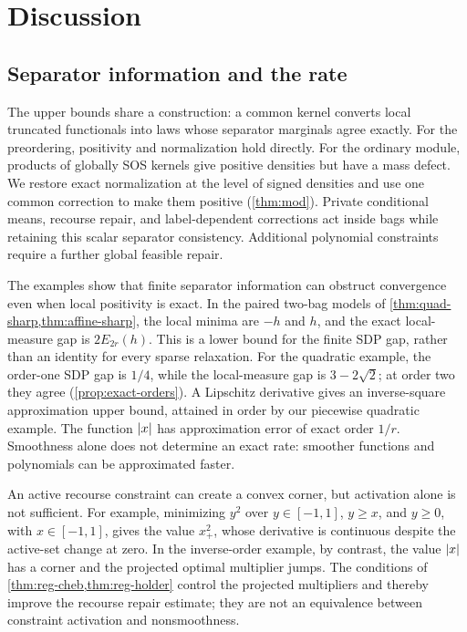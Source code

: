 \section{Discussion}\label{sec:discussion}

\subsection{Separator information and the rate}

The upper bounds share a construction: a common kernel converts local
truncated functionals into laws whose separator marginals agree exactly.
For the preordering, positivity and normalization hold directly. For the
ordinary module, products of globally SOS kernels give positive densities
but have a mass defect. We restore exact normalization at the level of
signed densities and use one common correction to make them positive
(\cref{thm:mod}). Private conditional means, recourse repair, and
label-dependent corrections act inside bags while retaining this scalar
separator consistency. Additional polynomial constraints require a further
global feasible repair.

The examples show that finite separator information can obstruct convergence
even when local positivity is exact. In the paired two-bag models of
\cref{thm:quad-sharp,thm:affine-sharp}, the local minima are $-h$ and $h$,
and the exact local-measure gap is $2E_{2r}(h)$. This is a lower bound for
the finite SDP gap, rather than an identity for every sparse relaxation.
For the quadratic example, the order-one SDP gap is $1/4$, while the
local-measure gap is $3-2\sqrt2$; at order two they agree
(\cref{prop:exact-orders}). A Lipschitz derivative gives an inverse-square
approximation upper bound, attained in order by our piecewise quadratic
example. The function $\lvert x\rvert$ has approximation error of exact order
$1/r$. Smoothness alone does not determine an exact rate: smoother functions
and polynomials can be approximated faster.

An active recourse constraint can create a convex corner, but activation
alone is not sufficient. For example, minimizing $y^2$ over
$y\in[-1,1]$, $y\ge x$, and $y\ge0$, with $x\in[-1,1]$, gives the value
$x_+^2$, whose derivative is continuous despite the active-set change at
zero. In the inverse-order example, by contrast, the value $\lvert x\rvert$ has a
corner and the projected optimal multiplier jumps. The conditions of
\cref{thm:reg-cheb,thm:reg-holder} control the projected multipliers and
thereby improve the recourse repair estimate; they are not an equivalence
between constraint activation and nonsmoothness.

